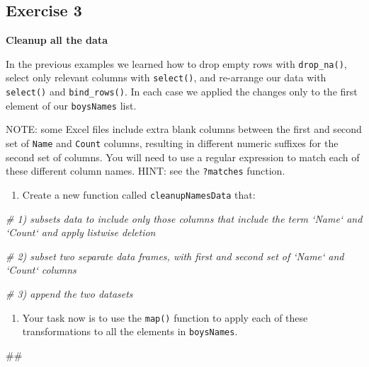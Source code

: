 \documentclass[]{book}
\newenvironment{Shaded}{\begin{snugshade}}{\end{snugshade}}
\newcommand{\CommentTok}[1]{\textcolor[rgb]{0.56,0.35,0.01}{\textit{#1}}}
\newcommand{\NormalTok}[1]{#1}
\providecommand{\tightlist}{%
  \setlength{\itemsep}{0pt}\setlength{\parskip}{0pt}}
\begin{document}
\subsection{Exercise 3}\label{exercise-3-3}

\textbf{Cleanup all the data}

In the previous examples we learned how to drop empty rows with
\texttt{drop\_na()}, select only relevant columns with
\texttt{select()}, and re-arrange our data with \texttt{select()} and
\texttt{bind\_rows()}. In each case we applied the changes only to the
first element of our \texttt{boysNames} list.

NOTE: some Excel files include extra blank columns between the first and
second set of \texttt{Name} and \texttt{Count} columns, resulting in
different numeric suffixes for the second set of columns. You will need
to use a regular expression to match each of these different column
names. HINT: see the \texttt{?matches} function.

\begin{enumerate}
\def\labelenumi{\arabic{enumi}.}
\tightlist
\item
  Create a new function called \texttt{cleanupNamesData} that:
\end{enumerate}

\begin{Shaded}
\begin{Highlighting}[]
\CommentTok{# 1) subsets data to include only those columns that include the term `Name` and `Count` and apply listwise deletion}

\CommentTok{# 2) subset two separate data frames, with first and second set of `Name` and `Count` columns}

\CommentTok{# 3) append the two datasets}
\end{Highlighting}
\end{Shaded}

\begin{enumerate}
\def\labelenumi{\arabic{enumi}.}
\setcounter{enumi}{1}
\tightlist
\item
  Your task now is to use the \texttt{map()} function to apply each of
  these transformations to all the elements in \texttt{boysNames}.
\end{enumerate}

\begin{Shaded}
\begin{Highlighting}[]
\NormalTok{## }
\end{Highlighting}
\end{Shaded}
\end{document}
